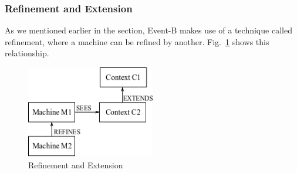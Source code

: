 \subsubsection{Refinement and Extension}\label{ref}
As we mentioned earlier in the section, Event-B makes use of a technique called refinement, where a machine can be refined by another. Fig.~\ref{fig:refine} shows this relationship.
%
\begin{figure}
\centering
\includegraphics[width=0.5\textwidth]{graphics/refinement.png}
\caption{Refinement and Extension}
\label{fig:refine}
\end{figure}
%
%
